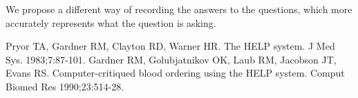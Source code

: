 \documentclass{amia}
\begin{document}
We propose a different way of recording the answers to the questions, which more accurately represents what the question is asking.

\makeatletter
\renewcommand{\@biblabel}[1]{\hfill #1.}
\makeatother


\begin{thebibliography}{1}
\setlength\itemsep{-0.1em}

Pryor TA, Gardner RM, Clayton RD, Warner HR. The HELP system. J Med Sys. 1983;7:87-101.
Gardner RM, Golubjatnikov OK, Laub RM, Jacobson JT, Evans RS. Computer-critiqued blood ordering using the HELP system. Comput Biomed Res 1990;23:514-28.

\end{thebibliography}
\end{document}
